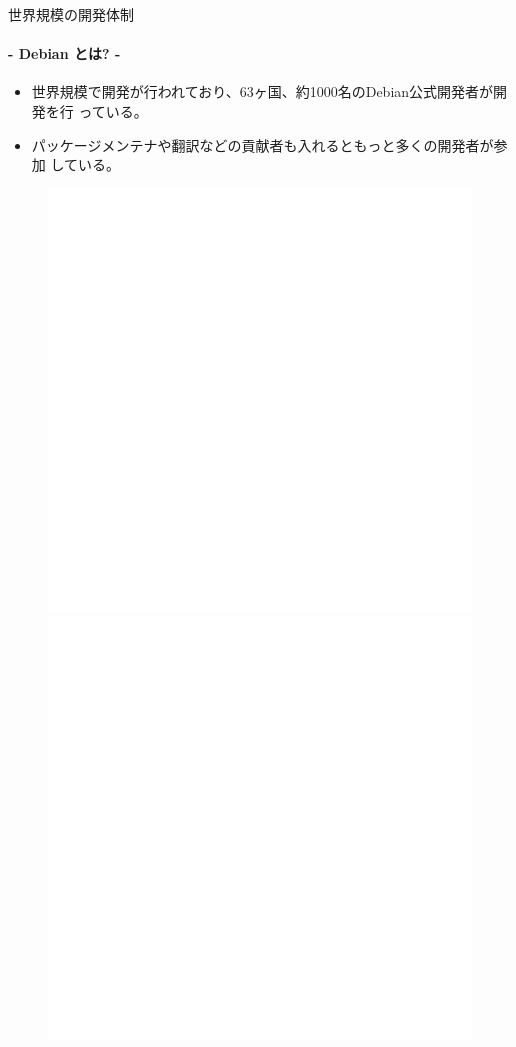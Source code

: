 \documentclass[cjk,dvipdfmx,14pt,compress,fragile]{beamer}
\begin{document}
\begin{frame}[c,fragile]{世界規模の開発体制}
  \framesubtitle{- Debian とは? -}
  \begin{itemize}
  \item %
    世界規模で開発が行われており、63ヶ国、約1000名のDebian公式開発者が開発を行
    っている。
  \item %
    パッケージメンテナや翻訳などの貢献者も入れるともっと多くの開発者が参加
    している。
  \end{itemize}
  \begin{figure}
    \centering
    \includegraphics[height=0.3\textheight]{image201701/blank.png}
    \includegraphics[height=0.3\textheight]{image201701/blank.png}
  \end{figure}
\end{frame}
\end{document}
